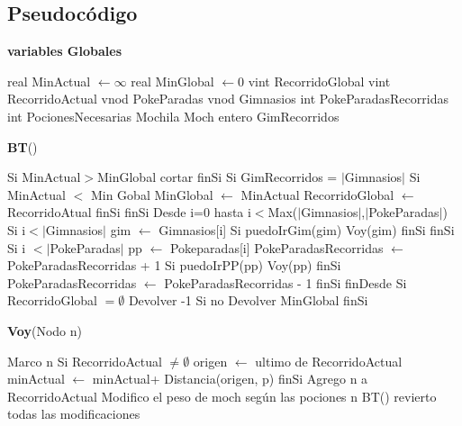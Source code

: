 \documentclass[spanish,12pt]{article}
\begin{document}

\subsection{Pseudocódigo}

\begin{algorithm}[H]{\textbf{variables Globales}}
	\begin{algorithmic}[1]
		\State real MinActual $\gets \infty$
		\State real MinGlobal $\gets 0$
		\State vint RecorridoGlobal
		\State vint RecorridoActual
		\State vnod PokeParadas
		\State vnod Gimnasios
		\State int PokeParadasRecorridas
		\State int PocionesNecesarias		
		\State Mochila Moch	
		\State entero GimRecorridos	
	
	\end{algorithmic}
\end{algorithm}

\begin{algorithm}[H]{\textbf{BT}()}
	\begin{algorithmic}[1]
		\State Si  MinActual$>$MinGlobal  
			 \State \quad cortar
		\State finSi
		\State Si GimRecorridos = $|$Gimnasios$|$ 
			\State \quad Si MinActual $<$ Min Gobal
				\State \qquad MinGlobal $\gets$ MinActual
				\State \qquad RecorridoGlobal $\gets$ RecorridoAtual
			\State \quad finSi
		\State finSi
		\State Desde i=0 hasta i$<$Max($|$Gimnasios$|$,$|$PokeParadas$|$)
			\State \quad Si i$< |$Gimnasios$|$
				\State \quad \quad gim $\gets$ Gimnasios[i]
				\State \quad \quad Si puedoIrGim(gim)
					\State \quad \quad \quad Voy(gim)
		 		\State \quad \quad finSi	
			\State \quad finSi
			\State \quad Si i $< |$PokeParadas$|$
				\State \qquad pp $\gets$ Pokeparadas[i]
				\State \qquad PokeParadasRecorridas $\gets$ PokeParadasRecorridas + 1 
				\State \qquad Si puedoIrPP(pp)
					\State \qquad \quad Voy(pp) 	
				\State \qquad finSi
				\State \qquad PokeParadasRecorridas $\gets$ PokeParadasRecorridas - 1 
			\State \quad finSi 
		\State finDesde
		\State Si RecorridoGlobal $= \emptyset$
			\State \quad Devolver -1
		\State Si no
			\State \quad Devolver MinGlobal
		\State finSi
 
	\end{algorithmic}
\end{algorithm}



\begin{algorithm}[H]{\textbf{Voy}(Nodo n)}
	\begin{algorithmic}[1]
		\State Marco n
		\State Si RecorridoActual $ \not= \emptyset$
		\State \quad origen $\gets$ ultimo de RecorridoActual
		\State \quad minActual $\gets$ minActual+ Distancia(origen, p)
		\State finSi
		\State Agrego n a RecorridoActual
		\State Modifico el peso de moch según las pociones n
		\State BT()
		\State revierto todas las modificaciones
	\end{algorithmic}
\end{algorithm}
\end{document}
